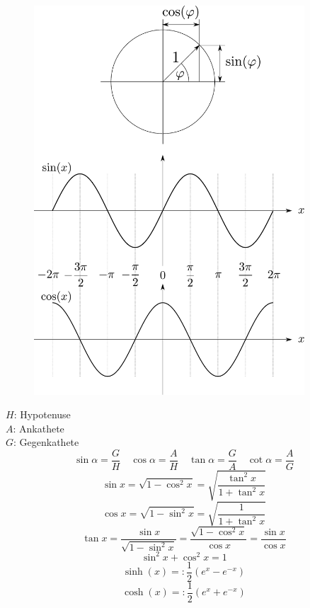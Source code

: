 \begin{figure}[h!]
\centering
\includegraphics[width=0.9\textwidth]{einheitskreis.pdf}
\end{figure}

\newpage
\noindent
$H$: Hypotenuse\\
$A$: Ankathete\\
$G$: Gegenkathete
\[ \boxed{\sin\alpha=\frac{G}{H}} \quad \boxed{\cos\alpha=\frac{A}{H}} \quad \boxed{\tan\alpha=\frac{G}{A}} \quad \boxed{\cot\alpha=\frac{A}{G}} \]
\[ \boxed{\sin x = \sqrt{1-\cos^2x} = \sqrt{\frac{\tan^2x}{1+\tan^2x}}} \]
\[ \boxed{\cos x = \sqrt{1-\sin^2x} = \sqrt{\frac{1}{1+\tan^2x}}} \]
\[ \boxed{\tan x = \frac{\sin x}{\sqrt{1-\sin^2x}} = \frac{\sqrt{1-\cos^2x}}{\cos x} = \frac{\sin x}{\cos x}} \]
\[ \boxed{\sin^2 x + \cos^2 x = 1} \]
\[ \boxed{\sinh(x) =: \frac{1}{2}\left(e^x - e^{-x} \right) }\]
\[ \boxed{\cosh(x) =: \frac{1}{2}\left(e^x + e^{-x} \right) }\]


